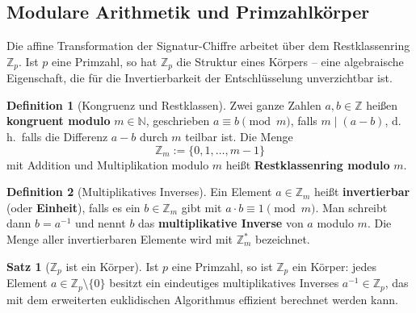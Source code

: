 ﻿\documentclass[a4paper,12pt]{scrreprt}
\theoremstyle{definition}
\newtheorem{definition}{Definition}[section]
\newtheorem{satz}{Satz}[section]
\begin{document}
\subsection{Modulare Arithmetik und Primzahlkörper}

Die affine Transformation der Signatur-Chiffre arbeitet über dem Restklassenring $\mathbb{Z}_p$. Ist $p$ eine Primzahl, so hat $\mathbb{Z}_p$ die Struktur eines Körpers -- eine algebraische Eigenschaft, die für die Invertierbarkeit der Entschlüsselung unverzichtbar ist.

\begin{definition}[Kongruenz und Restklassen]
	\label{def:kongruenz}
	Zwei ganze Zahlen $a, b \in \mathbb{Z}$ heißen \textbf{kongruent modulo} $m \in \mathbb{N}$, geschrieben $a \equiv b \pmod{m}$, falls $m \mid (a-b)$, d.\,h.\ falls die Differenz $a - b$ durch $m$ teilbar ist. Die Menge
	\[
	\mathbb{Z}_m := \{0, 1, \ldots, m-1\}
	\]
	mit Addition und Multiplikation modulo $m$ heißt \textbf{Restklassenring modulo} $m$.
\end{definition}

\begin{definition}[Multiplikatives Inverses]
	\label{def:inv}
	Ein Element $a \in \mathbb{Z}_m$ heißt \textbf{invertierbar} (oder \textbf{Einheit}), falls es ein $b \in \mathbb{Z}_m$ gibt mit $a \cdot b \equiv 1 \pmod{m}$. Man schreibt dann $b = a^{-1}$ und nennt $b$ das \textbf{multiplikative Inverse} von $a$ modulo $m$. Die Menge aller invertierbaren Elemente wird mit $\mathbb{Z}_m^*$ bezeichnet.
\end{definition}

\begin{satz}[$\mathbb{Z}_p$ ist ein Körper]
	\label{satz:koerper}
	Ist $p$ eine Primzahl, so ist $\mathbb{Z}_p$ ein Körper: jedes Element $a \in \mathbb{Z}_p \setminus \{0\}$ besitzt ein eindeutiges multiplikatives Inverses $a^{-1} \in \mathbb{Z}_p$, das mit dem erweiterten euklidischen Algorithmus \cite{Buc16} effizient berechnet werden kann.
\end{satz}
\end{document}
